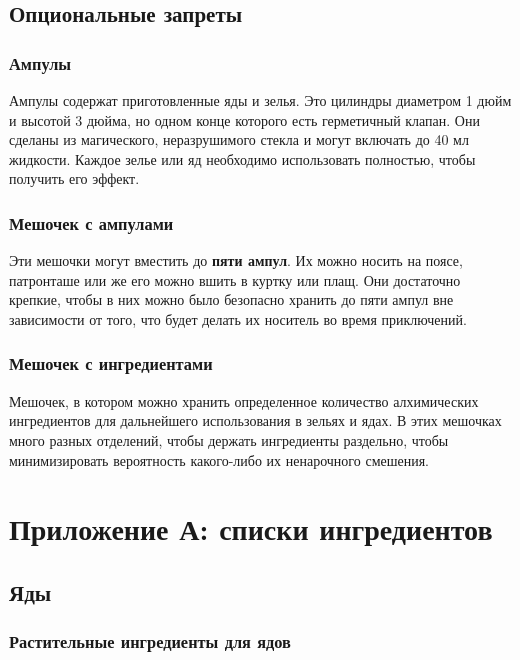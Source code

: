 \documentclass[a4paper, 9pt, twocolumn]{book}
\begin{document}
	\section{Опциональные запреты}
	
	\subsection{Ампулы}
	
	Ампулы содержат приготовленные яды и зелья. Это цилиндры диаметром 1 дюйм и высотой 3 дюйма, но одном конце которого есть герметичный клапан. Они сделаны из магического, неразрушимого стекла и могут включать до 40 мл жидкости. Каждое зелье или яд необходимо использовать полностью, чтобы получить его эффект.
	
	\subsection{Мешочек с ампулами}
	
	Эти мешочки могут вместить до \textbf{пяти ампул}. Их можно носить на поясе, патронташе или же его можно вшить в куртку или плащ. Они достаточно крепкие, чтобы в них можно было безопасно хранить до пяти ампул вне зависимости от того, что будет делать их носитель во время приключений.
	
	\subsection{Мешочек с ингредиентами}
	
	Мешочек, в котором можно хранить определенное количество алхимических ингредиентов для дальнейшего использования в зельях и ядах. В этих мешочках много разных отделений, чтобы держать ингредиенты раздельно, чтобы минимизировать вероятность какого-либо их ненарочного смешения.
	
	\chapter{Приложение А: списки ингредиентов}
	
	\section{Яды}
	
	\subsection{Растительные ингредиенты для ядов}
	
\end{document}
